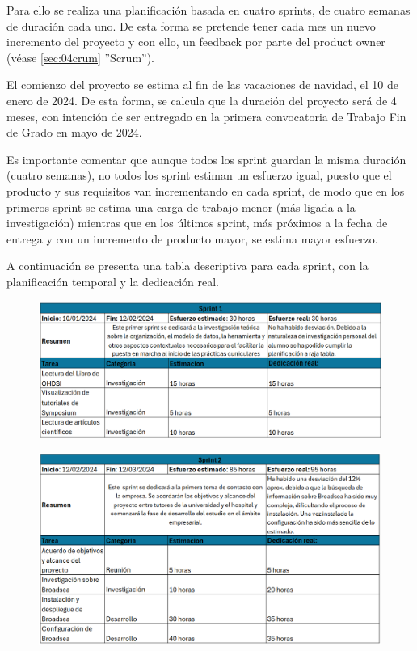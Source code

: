 Para ello se realiza una planificación basada en cuatro sprints, de cuatro semanas de duración cada uno. De esta forma se pretende tener cada mes un nuevo incremento del proyecto y con ello, un feedback por parte del product owner (véase \ref{sec:04crum} ''Scrum''). 

El comienzo del proyecto se estima al fin de las vacaciones de navidad, el 10 de enero de 2024. De esta forma, se calcula que la duración del proyecto será de 4 meses, con intención de ser entregado en la primera convocatoria de Trabajo Fin de Grado en mayo de 2024.

Es importante comentar que aunque todos los sprint guardan la misma duración (cuatro semanas), no todos los sprint estiman un esfuerzo igual, puesto que el producto y sus requisitos van incrementando en cada sprint, de modo que en los primeros sprint se estima una carga de trabajo menor (más ligada a la investigación) mientras que en los últimos sprint, más próximos a la fecha de entrega y con un incremento de producto mayor, se estima mayor esfuerzo.

A continuación se presenta una tabla descriptiva para cada sprint, con la planificación temporal y la dedicación real. 

\begin{figure}[H]
    \centering
    \includegraphics[width=1\textwidth]{tables/sprint1cap.png}
    \label{table:sprint1cap}
\end{figure}

\begin{figure}[H]
    \centering
    \includegraphics[width=1\textwidth]{tables/sprint2cap.png}
    \label{table:sprint2cap}
\end{figure}

